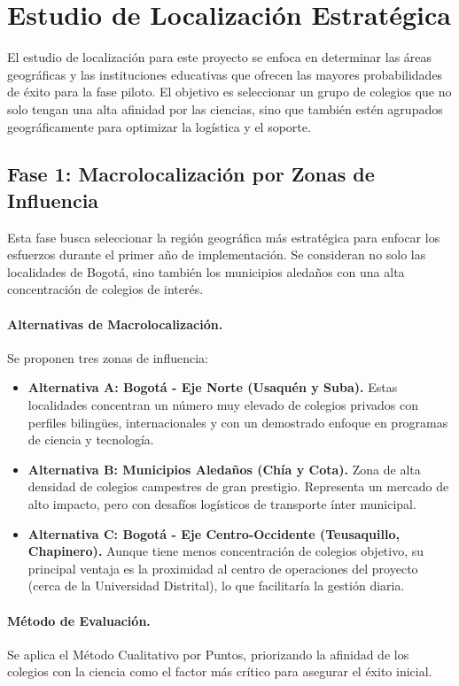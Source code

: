 \section{Estudio de Localización Estratégica}

El estudio de localización para este proyecto se enfoca en determinar las áreas
geográficas y las instituciones educativas que ofrecen las mayores
probabilidades de éxito para la fase piloto. El objetivo es seleccionar un grupo
de colegios que no solo tengan una alta afinidad por las ciencias, sino que
también estén agrupados geográficamente para optimizar la logística y el
soporte.

\subsection{Fase 1: Macrolocalización por Zonas de Influencia}

Esta fase busca seleccionar la región geográfica más estratégica para enfocar
los esfuerzos durante el primer año de implementación. Se consideran no solo las
localidades de Bogotá, sino también los municipios aledaños con una alta
concentración de colegios de interés.

\paragraph{Alternativas de Macrolocalización.} Se proponen tres zonas de influencia:
\begin{itemize}
  \item \textbf{Alternativa A: Bogotá - Eje Norte (Usaquén y Suba).} Estas
    localidades concentran un número muy elevado de colegios privados con
    perfiles bilingües, internacionales y con un demostrado enfoque en programas
    de ciencia y tecnología.
  \item \textbf{Alternativa B: Municipios Aledaños (Chía y Cota).} Zona de alta
    densidad de colegios campestres de gran prestigio. Representa un mercado de
    alto impacto, pero con desafíos logísticos de transporte ínter municipal.
  \item \textbf{Alternativa C: Bogotá - Eje Centro-Occidente (Teusaquillo,
    Chapinero).} Aunque tiene menos concentración de colegios objetivo, su
    principal ventaja es la proximidad al centro de operaciones del proyecto
    (cerca de la Universidad Distrital), lo que facilitaría la gestión diaria.
\end{itemize}

\paragraph{Método de Evaluación.} Se aplica el Método Cualitativo por Puntos,
priorizando la afinidad de los colegios con la ciencia como el factor más
crítico para asegurar el éxito inicial.

